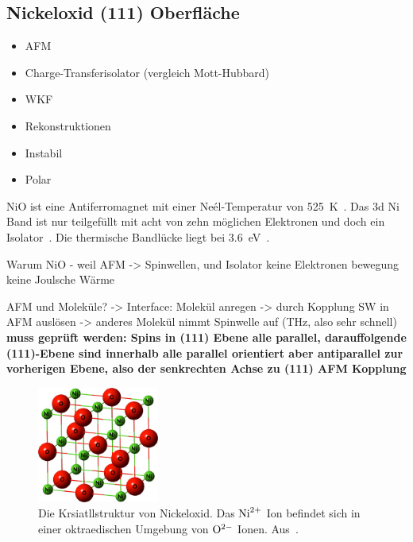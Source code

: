         \subsection{Nickeloxid (111) Oberfläche}
            \begin{itemize}
                \item AFM
                \item Charge-Transferisolator (vergleich Mott-Hubbard)
                \item WKF
                \item Rekonstruktionen
                \item Instabil
                \item Polar
            \end{itemize}
            NiO ist eine Antiferromagnet mit einer Neél-Temperatur von \SI{525}{\kelvin}~\cite{kunz_chemisorption_1985}.
            Das 3d Ni Band ist nur teilgefüllt mit acht von zehn möglichen Elektronen und doch ein Isolator~\cite{kunz_chemisorption_1985}.
            Die thermische Bandlücke liegt bei \SI{3.6}{\electronvolt}~\cite{kunz_chemisorption_1985}.

            Warum NiO - weil AFM -> Spinwellen, und Isolator keine Elektronen bewegung keine Joulsche Wärme

            AFM und Moleküle? -> Interface: Molekül anregen -> durch Kopplung SW in AFM auslösen -> anderes Molekül nimmt Spinwelle auf (THz, also sehr schnell)
            \textbf{muss geprüft werden: Spins in (111) Ebene alle parallel, darauffolgende (111)-Ebene sind innerhalb alle parallel orientiert aber antiparallel zur vorherigen Ebene, also der senkrechten Achse zu (111) AFM Kopplung}

            \begin{figure}
                \centering
                \includegraphics[width=4cm]{./content/pictures/NiO-structure}
                \caption{Die Krsiatllstruktur von Nickeloxid. Das $\ce{Ni}^{2+}$ Ion befindet sich in einer oktraedischen Umgebung von $\ce{O}^{2-}$ Ionen. Aus~\cite{NiO-structure}.}
                \label{fig:NiO-structure}
            \end{figure}

